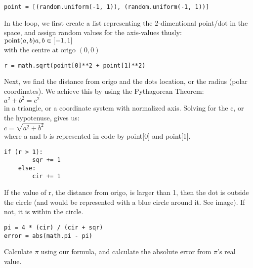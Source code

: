 \documentclass{article}
\begin{document}
\begin{mdframed}
\begin{lstlisting}
point = [(random.uniform(-1, 1)), (random.uniform(-1, 1))]
\end{lstlisting}
\end{mdframed}
In the loop, we first create a list representing the 2-dimentional point/dot in the space, and assign random values for the axis-values thusly: \\
$\text{point}(a, b) \\
a, b \in [-1, 1]$ \\
with the centre at origo $(0, 0)$ \\

\begin{mdframed}
\begin{lstlisting}
r = math.sqrt(point[0]**2 + point[1]**2)
\end{lstlisting}
\end{mdframed}
Next, we find the distance from origo and the dots location, or the radius (polar coordinates).
We achieve this by using the Pythagorean Theorem: \\
$a^2 + b^2 = c^2$ \\
in a triangle, or a coordinate system with normalized axis.
Solving for the c, or the hypotenuse, gives us: \\
$c = \sqrt{a^2 + b^2}$ \\
where a and b is represented in code by point[0] and point[1]. \\

\begin{mdframed}
\begin{lstlisting}
if (r > 1):
        sqr += 1
    else:
        cir += 1
\end{lstlisting}
\end{mdframed}
If the value of r, the distance from origo, is larger than 1, then the dot is outside the circle (and would be represented with a blue circle around it. See image).
If not, it is within the circle.

\hfill

\begin{mdframed}
\begin{lstlisting}
pi = 4 * (cir) / (cir + sqr)
error = abs(math.pi - pi)
\end{lstlisting}
\end{mdframed}
Calculate $\pi$ using our formula, and calculate the absolute error from $\pi$'s real value.

\hfill
\end{document}
